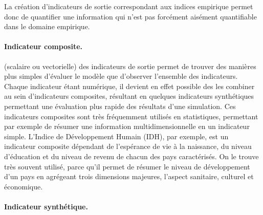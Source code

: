 La création d'indicateurs de sortie correspondant aux indices empirique permet donc de quantifier une information qui n'est pas forcément aisément quantifiable dans le domaine empirique.

\paragraph{Indicateur composite.}

(scalaire ou vectorielle) des indicateurs de sortie permet de trouver des manières plus simples d'évaluer le modèle que d'observer l'ensemble des indicateurs.
Chaque indicateur étant numérique, il devient en effet possible des les combiner au sein d'indicateurs composites, résultant en quelques indicateurs synthétiques permettant une évaluation plus rapide des résultats d'une simulation.
Ces indicateurs composites sont très fréquemment utilisés en statistiques, permettant par exemple de résumer une information multidimensionnelle en un indicateur simple.
L'Indice de Développement Humain (IDH), par exemple, est un indicateur composite dépendant de l'espérance de vie à la naissance, du niveau d'éducation et du niveau de revenu de chacun des pays caractérisés.
On le trouve très souvent utilisé, parce qu'il permet de résumer le niveau de développement d'un pays en agrégeant trois dimensions majeures, l'aspect sanitaire, culturel et économique.

\paragraph{Indicateur synthétique.}

